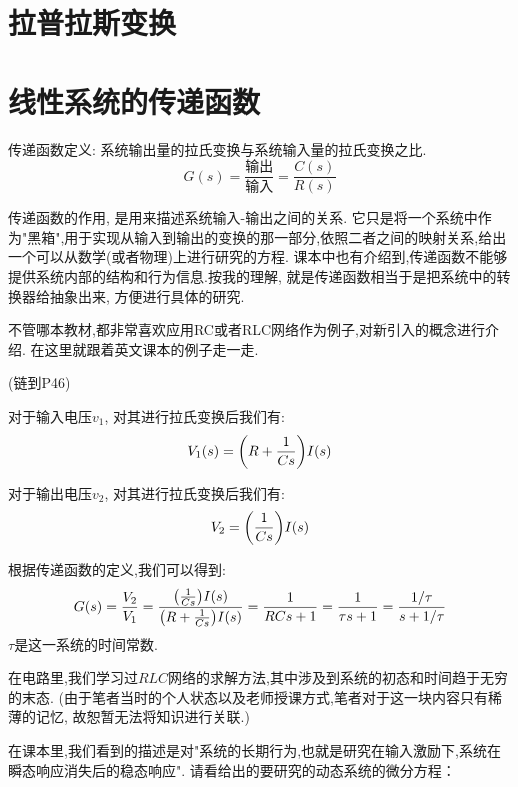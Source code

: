 \documentclass{NHNotebook}
\begin{document}
\section{拉普拉斯变换}

\section{线性系统的传递函数}
传递函数定义: 系统输出量的拉氏变换与系统输入量的拉氏变换之比. 
$$G(s)=\frac{\text{输出}}{\text{输入}}=\frac{C(s)}{R(s)}$$

传递函数的作用, 是用来描述系统输入-输出之间的关系.
它只是将一个系统中作为"黑箱",用于实现从输入到输出的变换的那一部分,依照二者之间的映射关系,给出一个可以从数学(或者物理)上进行研究的方程.
课本中也有介绍到,传递函数不能够提供系统内部的结构和行为信息.按我的理解, 就是传递函数相当于是把系统中的转换器给抽象出来, 方便进行具体的研究.

不管哪本教材,都非常喜欢应用RC或者RLC网络作为例子,对新引入的概念进行介绍.
在这里就跟着英文课本的例子走一走.

(链到P46)

对于输入电压$v_1$, 对其进行拉氏变换后我们有:
\begin{equation}
    V_1(s)=\qty( R+\frac{1}{Cs})I(s)
\end{equation}

对于输出电压$v_2$, 对其进行拉氏变换后我们有:
\begin{equation}
    V_2 = \qty(\frac{1}{Cs})I(s)
\end{equation}

根据传递函数的定义,我们可以得到:
\begin{equation}
    G(s) = \frac{V_2}{V_1} \\
    = \frac{\qty(\frac{1}{Cs})I(s)}{\qty( R+\frac{1}{Cs})I(s)} \\
    = \frac{1}{RCs+1} \\
    = \frac{1}{\tau s+1} \\
    = \frac{1 / \tau}{s + 1 / \tau}
\end{equation}
$\tau$是这一系统的时间常数.

在电路里,我们学习过$RLC$网络的求解方法,其中涉及到系统的初态和时间趋于无穷的末态.
(由于笔者当时的个人状态以及老师授课方式,笔者对于这一块内容只有稀薄的记忆, 故恕暂无法将知识进行关联.)

在课本里,我们看到的描述是对\textcolor{LakeBlue}{"系统的长期行为,也就是研究在输入激励下,系统在瞬态响应消失后的稳态响应"}. 
请看给出的要研究的动态系统的微分方程：
\begin{equation}
    
\end{equation}
\end{document}
